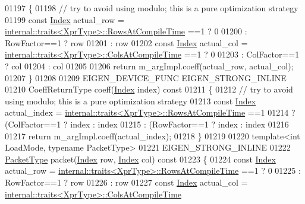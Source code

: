 \begin{DoxyCode}
01197 \textcolor{keyword}{  }\{
01198     \textcolor{comment}{// try to avoid using modulo; this is a pure optimization strategy}
01199     \textcolor{keyword}{const} \hyperlink{namespace_eigen_a62e77e0933482dafde8fe197d9a2cfde}{Index} actual\_row = \hyperlink{struct_eigen_1_1internal_1_1traits}{internal::traits<XprType>::RowsAtCompileTime}
      ==1 ? 0
01200                            : RowFactor==1 ? row
01201                            : row %
01202     \textcolor{keyword}{const} \hyperlink{namespace_eigen_a62e77e0933482dafde8fe197d9a2cfde}{Index} actual\_col = \hyperlink{struct_eigen_1_1internal_1_1traits}{internal::traits<XprType>::ColsAtCompileTime}
      ==1 ? 0
01203                            : ColFactor==1 ? col
01204                            : col %
01205     
01206     \textcolor{keywordflow}{return} m\_argImpl.coeff(actual\_row, actual\_col);
01207   \}
01208   
01209   EIGEN\_DEVICE\_FUNC EIGEN\_STRONG\_INLINE
01210   CoeffReturnType coeff(\hyperlink{namespace_eigen_a62e77e0933482dafde8fe197d9a2cfde}{Index} index)\textcolor{keyword}{ const}
01211 \textcolor{keyword}{  }\{
01212     \textcolor{comment}{// try to avoid using modulo; this is a pure optimization strategy}
01213     \textcolor{keyword}{const} \hyperlink{namespace_eigen_a62e77e0933482dafde8fe197d9a2cfde}{Index} actual\_index = \hyperlink{struct_eigen_1_1internal_1_1traits}{internal::traits<XprType>::RowsAtCompileTime}
      ==1
01214                                   ? (ColFactor==1 ?  index : index%
01215                                   : (RowFactor==1 ?  index : index%
01216     
01217     \textcolor{keywordflow}{return} m\_argImpl.coeff(actual\_index);
01218   \}
01219 
01220   \textcolor{keyword}{template}<\textcolor{keywordtype}{int} LoadMode, \textcolor{keyword}{typename} PacketType>
01221   EIGEN\_STRONG\_INLINE
01222   \hyperlink{struct_eigen_1_1_packet_type}{PacketType} packet(\hyperlink{namespace_eigen_a62e77e0933482dafde8fe197d9a2cfde}{Index} row, \hyperlink{namespace_eigen_a62e77e0933482dafde8fe197d9a2cfde}{Index} col)\textcolor{keyword}{ const}
01223 \textcolor{keyword}{  }\{
01224     \textcolor{keyword}{const} \hyperlink{namespace_eigen_a62e77e0933482dafde8fe197d9a2cfde}{Index} actual\_row = \hyperlink{struct_eigen_1_1internal_1_1traits}{internal::traits<XprType>::RowsAtCompileTime}
      ==1 ? 0
01225                            : RowFactor==1 ? row
01226                            : row %
01227     \textcolor{keyword}{const} \hyperlink{namespace_eigen_a62e77e0933482dafde8fe197d9a2cfde}{Index} actual\_col = \hyperlink{struct_eigen_1_1internal_1_1traits}{internal::traits<XprType>::ColsAtCompileTime}

\end{DoxyCode}
